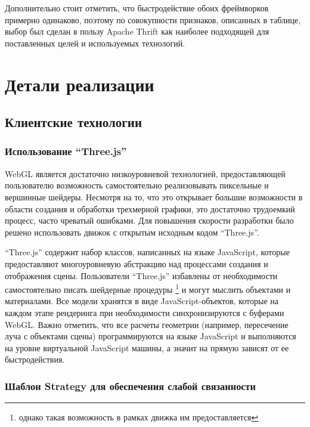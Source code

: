 \documentclass[14pt, a4paper]{extarticle}
\let\stdsection\section
\renewcommand\section{\newpage\stdsection}
\begin{document}
Дополнительно стоит отметить, что быстродействие обоих фреймворков примерно
одинаково, поэтому по совокупности признаков, описанных в таблице, выбор был
сделан в пользу Apache Thrift как наиболее подходящей для поставленных целей и
используемых технологий.

\section{Детали реализации}

\subsection{Клиентские технологии}

\subsubsection{Использование ``Three.js''}

WebGL является достаточно низкоуровневой технологией, предоставляющей
пользователю возможность самостоятельно реализовывать пиксельные и вершинные
шейдеры.
Несмотря на то, что это открывает большие возможности в области создания и
обработки трехмерной графики, это достаточно трудоемкий процесс, часто чреватый
ошибками. Для повышения скорости разработки было решено использовать движок с
открытым исходным кодом ``Three.js''.

``Three.js''\cite{threejs} содержит набор классов, написанных на языке JavaScript, которые
предоставляют многоуровневую абстракцию над процессами создания и отображения
сцены. Пользователи ``Three.js'' избавлены от необходимости самостоятельно писать
шейдерные процедуры \footnote{однако такая возможность в рамках движка им
предоставляется} и могут мыслить объектами и материалами. Все модели
хранятся в виде JavaScript-объектов, которые на каждом этапе рендеринга при
необходимости синхронизируются с буферами WebGL. Важно отметить, что все
 расчеты геометрии (например, пересечение луча с объектами сцены)
программируются на языке JavaScript и выполняются на уровне виртуальной
JavaScript машины, а значит на прямую зависят от ее быстродействия.

\subsubsection{Шаблон Strategy для обеспечения слабой связанности}
\end{document}
